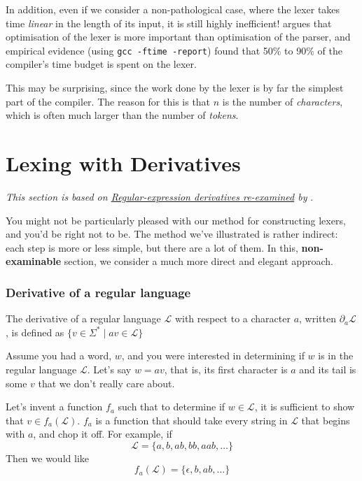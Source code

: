 In addition, even if we consider a non-pathological case, where the lexer takes time \emph{linear} in the length of its input, it is still highly inefficient! \citet{sebesta-1993} argues that optimisation of the lexer is more important than optimisation of the parser, and empirical evidence (using \texttt{gcc -ftime -report}) found that 50\% to 90\% of the compiler's time budget is spent on the lexer.

This may be surprising, since the work done by the lexer is by far the simplest part of the compiler. The reason for this is that $n$ is the number of \emph{characters}, which is often much larger than the number of \emph{tokens}.

\section{Lexing with Derivatives\optional}
\textit{This section is based on \href{https://www.cambridge.org/core/journals/journal-of-functional-programming/article/regularexpression-derivatives-reexamined/E5734B86DEB96C61C69E5CF3C4FB0AFA}{Regular-expression derivatives re-examined} by} \citet{owens-2009}.

You might not be particularly pleased with our method for constructing lexers, and you'd be right not to be. The method we've illustrated is rather indirect: each step is more or less simple, but there are a lot of them. In this, \textsf{\textbf{non-examinable}} section, we consider a much more direct and elegant approach.

\subsubsection{Derivative of a regular language}
\vspace{3mm}

\begin{definition}
    The derivative of a regular language $\mathcal{L}$ with respect to a character $a$, written $\partial_a \mathcal{L}$, is defined as $\{v \in \Sigma^{*} \mid av \in \mathcal{L} \}$
\end{definition}

Assume you had a word, $w$, and you were interested in determining if $w$ is in the regular language $\mathcal{L}$. Let's say $w = av$, that is, its first character is $a$ and its tail is some $v$ that we don't really care about.

Let's invent a function $f_a$ such that to determine if $w \in \mathcal{L}$, it is sufficient to show that $v \in f_a(\mathcal{L})$. $f_a$ is a function that should take every string in $\mathcal{L}$ that begins with $a$, and chop it off. For example, if \[\mathcal{L} = \{ a, b, ab, bb, aab, \ldots \}\] Then we would like \[f_a(\mathcal{L}) = \{ \epsilon, b, ab, \ldots\} \]

